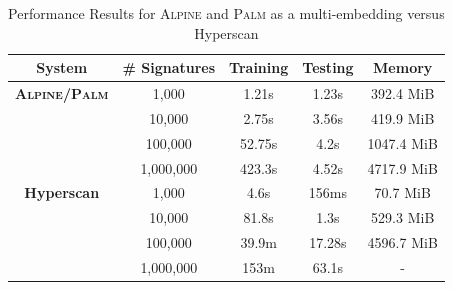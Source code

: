 \begin{table}[ht!]
\centering
\begin{tabular}{| c | c | c | c | c |}
\hline
System & \# Signatures & Training & Testing & Memory \\
\hline
\hline
\textbf{\textsc{Alpine}/\textsc{Palm}} & 1,000 &  1.21s &  1.23s & 392.4 MiB \\
& 10,000 & 2.75s & 3.56s & 419.9 MiB \\
& 100,000 & 52.75s & 4.2s & 1047.4 MiB \\
& 1,000,000 & 423.3s & 4.52s & 4717.9 MiB \\
\hline
\textbf{Hyperscan} & 1,000 & 4.6s & 156ms & 70.7 MiB \\
& 10,000 & 81.8s & 1.3s & 529.3 MiB \\
& 100,000 & 39.9m & 17.28s & 4596.7 MiB \\
& 1,000,000 & 153m & 63.1s & - \\
\hline
\end{tabular}
\caption{Performance Results for \textsc{Alpine} and \textsc{Palm} as a multi-embedding versus Hyperscan}
\label{table:performanceresults}
\end{table}

